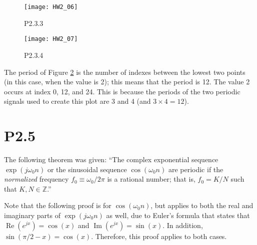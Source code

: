 \documentclass{article}
\begin{document}
\begin{figure}[H]
    \centering
    \texttt{[image: HW2\_06]}
    \caption{P2.3.3}
    \label{P2.3.3}
\end{figure}%
\begin{figure}[H]
    \centering
    \texttt{[image: HW2\_07]}
    \caption{P2.3.4}
    \label{P2.3.4}
\end{figure}

The period of Figure \ref{P2.3.4} is the number of indexes
between the lowest two points (in this case, when the value is
\num{2}); this means that the period is \num{12}. The value 2
occurs at index 0, 12, and 24. This is
because the periods of the two periodic signals used to create
this plot are 3 and 4 (and \(3 \times 4 = 12\)).

\section*{P2.5}

The following theorem was given:
``The complex exponential sequence \(\exp(j\omega_0n)\)
or the sinusoidal sequence \(\cos(\omega_0n)\) are periodic if
the \emph{normalized} frequency \(f_0 \equiv \omega_0/2\pi\)
is a rational number; that is, \(f_0 = K/N\) such that
\(K, N \in \mathbb{Z}\).''

Note that the following proof
is for \(\cos(\omega_0n)\), but applies to both the real and
imaginary parts of
\(\exp(j\omega_0n)\) as well, due to Euler's formula that states
that \(\operatorname{Re}\left(e^{jx}\right) = \cos(x)\) and
\(\operatorname{Im}\left(e^{jx}\right) = \sin(x)\). In addition,
\( \sin(\pi/2 - x) = \cos(x) \). Therefore, this proof
applies to both cases.
\end{document}
